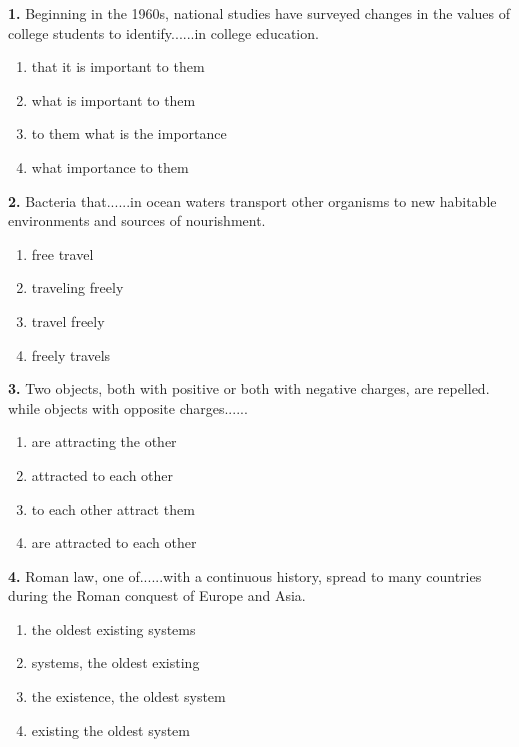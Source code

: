 \documentclass[12pt]{article}
\begin{document}
\noindent\textbf{1.} Beginning in the 1960s, national studies have surveyed changes in the values of college students to identify......in college education.
\begin{enumerate}[label=(\Alph*),leftmargin=*,itemsep=0.2em]
\item that it is important to them
\item what is important to them
\item to them what is the importance
\item what importance to them
\end{enumerate}
\par
\vspace{0.25\baselineskip}
\noindent\textbf{2.} Bacteria that......in ocean waters transport other organisms to new habitable environments and sources of nourishment.
\begin{enumerate}[label=(\Alph*),leftmargin=*,itemsep=0.2em]
\item free travel
\item traveling freely
\item travel freely
\item freely travels
\end{enumerate}
\par
\vspace{0.25\baselineskip}
\noindent\textbf{3.} Two objects, both with positive or both with negative charges, are repelled. while objects with opposite charges......
\begin{enumerate}[label=(\Alph*),leftmargin=*,itemsep=0.2em]
\item are attracting the other
\item attracted to each other
\item to each other attract them
\item are attracted to each other
\end{enumerate}
\par
\vspace{0.25\baselineskip}
\noindent\textbf{4.} Roman law, one of......with a continuous history, spread to many countries during the Roman conquest of Europe and Asia.
\begin{enumerate}[label=(\Alph*),leftmargin=*,itemsep=0.2em]
\item the oldest existing systems
\item systems, the oldest existing
\item the existence, the oldest system
\item existing the oldest system
\end{enumerate}
\end{document}
